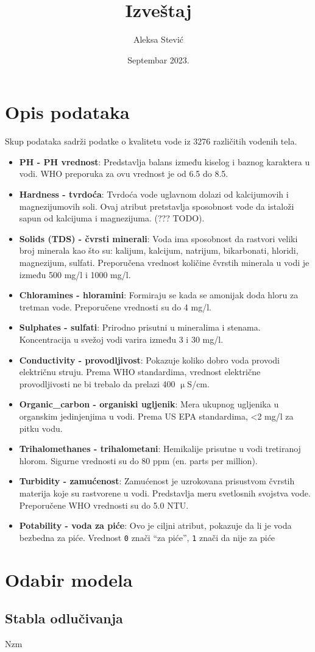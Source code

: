 \documentclass[12pt, a4paper]{article}
\title{Izveštaj}
\author{Aleksa Stević}
\date{Septembar 2023.}
\begin{document}
    \maketitle
    \newpage
    \section{Opis podataka}

    Skup podataka sadrži podatke o kvalitetu vode iz 3276 različitih vodenih tela.
    
    \begin{itemize}
        \item \textbf{PH - PH vrednost}:
            Predstavlja balans između kiselog i baznog karaktera u vodi.
            WHO preporuka za ovu vrednost je od 6.5 do 8.5.
        \item \textbf{Hardness - tvrdoća}:
            Tvrdoća vode uglavnom dolazi od kalcijumovih i magnezijumovih soli.
            Ovaj atribut pretstavlja sposobnost vode da istaloži sapun od kalcijuma i magnezijuma. (??? TODO).
        \item \textbf{Solids (TDS) - čvrsti minerali}:
            Voda ima sposobnost da rastvori veliki broj minerala kao što su: kalijum, kalcijum, natrijum, bikarbonati,
            hloridi, magnezijum, sulfati.
            Preporučena vrednost količine čvrstih minerala u vodi je između 500 mg/l i 1000 mg/l.
        \item \textbf{Chloramines - hloramini}:
            Formiraju se kada se amonijak doda hloru za tretman vode.
            Preporučene vrednosti su do 4 mg/l.
        \item \textbf{Sulphates - sulfati}:
            Prirodno prisutni u mineralima i stenama.
            Koncentracija u svežoj vodi varira između 3 i 30 mg/l.
        \item \textbf{Conductivity - provodljivost}:
            Pokazuje koliko dobro voda provodi električnu struju.
            Prema WHO standardima, vrednost električne provodljivosti ne bi trebalo da prelazi 400 $\upmu$S/cm.
        \item \textbf{Organic\_carbon - organiski ugljenik}:
            Mera ukupnog ugljenika u organskim jedinjenjima u vodi.
            Prema US EPA standardima, <2 mg/l za pitku vodu.
        \item \textbf{Trihalomethanes - trihalometani}:
            Hemikalije prisutne u vodi tretiranoj hlorom.
            Sigurne vrednosti su do 80 ppm (en. parts per million).
        \item \textbf{Turbidity - zamućenost}:
            Zamućenost je uzrokovana prisustvom čvrstih materija koje su rastvorene u vodi.
            Predstavlja meru svetlosnih svojstva vode.
            Preporučene WHO vrednosti su do 5.0 NTU.
        \item \textbf{Potability - voda za piće}:
            Ovo je ciljni atribut, pokazuje da li je voda bezbedna za piće.
            Vrednost \texttt{0} znači ``za piće'', \texttt{1} znači da nije za piće
    \end{itemize}

    \section{Odabir modela}
    \subsection{Stabla odlučivanja}
    Nzm
\end{document}
